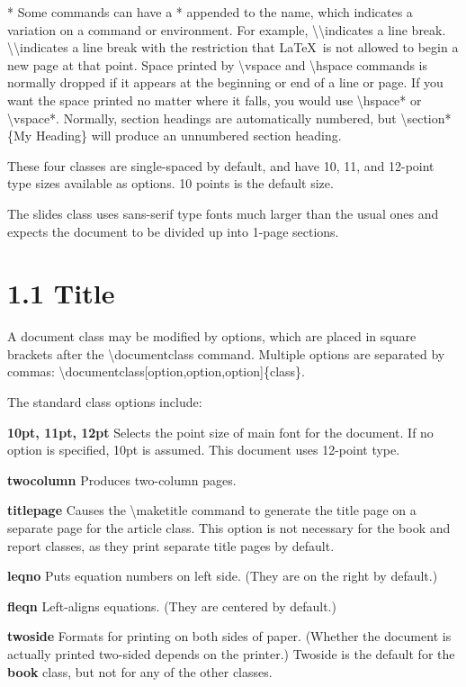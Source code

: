 \documentclass[12pt,openright]{book}
\begin{document}
* Some commands can have a * appended to the name, which indicates a variation on a command or environment. For example, \textbackslash\textbackslash indicates a line break. \textbackslash\textbackslash* indicates a line break with the restriction that \LaTeX\ is not allowed to begin a new page at that point. Space printed by \textbackslash vspace and \textbackslash hspace commands is normally dropped if it appears at the beginning or end of a line or page. If you want the space printed no matter where it falls, you would use \textbackslash hspace* or \textbackslash vspace*. Normally, section headings are automatically numbered, but \textbackslash section*\{My Heading\} will produce an unnumbered section heading.

These four classes are single-spaced by default, and have 10, 11, and 12-point type sizes available as options. 10 points is the default size.

The slides class uses sans-serif type fonts much larger than the usual ones and expects the document to be divided up into 1-page sections.

\section{1.1 Title}

A document class may be modified by options, which are placed in square brackets after the \textbackslash documentclass command. Multiple options are separated by commas: \textbackslash documentclass[option,option,option]\{class\}.

The standard class options include:

\textbf{10pt, 11pt, 12pt} Selects the point size of main font for the document. If no option is specified, 10pt is assumed. This document uses 12-point type.

\textbf{twocolumn} Produces two-column pages.

\textbf{titlepage} Causes the \textbackslash maketitle command to generate the title page on a separate page for the article class. This option is not necessary for the book and report classes, as they print separate title pages by default.

\textbf{leqno} Puts equation numbers on left side. (They are on the right by default.)

\textbf{fleqn} Left-aligns equations. (They are centered by default.)

\textbf{twoside} Formats for printing on both sides of paper. (Whether the document is actually printed two-sided depends on the printer.) Twoside is the default for the \textbf{book} class, but not for any of the other classes.
\end{document}
